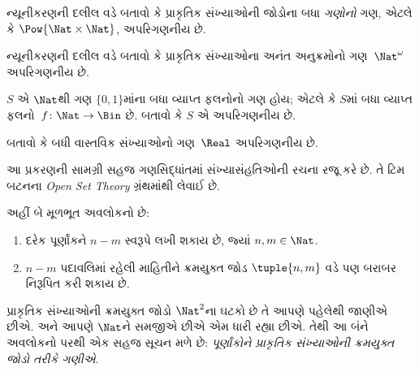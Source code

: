 \begin{prob}
ન્યૂનીકરણની દલીલ વડે બતાવો કે પ્રાકૃતિક સંખ્યાઓની જોડોના બધા
\emph{ગણોનો} ગણ, એટલે કે $\Pow{\Nat \times \Nat}$, અપરિગણનીય છે.
\end{prob}

\begin{prob}
ન્યૂનીકરણની દલીલ વડે બતાવો કે પ્રાકૃતિક સંખ્યાઓના અનંત
અનુક્રમોનો ગણ~$\Nat^\omega$ અપરિગણનીય છે.
\end{prob}


\begin{prob}
$S$ એ $\Nat$થી ગણ $\{0,1\}$માંના બધા વ્યાપ્ત ફલનોનો ગણ હોય;
એટલે કે $S$માં બધા વ્યાપ્ત ફલનો~$f \colon \Nat \to \Bin$ છે.
બતાવો કે $S$ એ અપરિગણનીય છે.
\end{prob}

\begin{prob}
બતાવો કે બધી વાસ્તવિક સંખ્યાઓનો ગણ~$\Real$ અપરિગણનીય છે.
\end{prob}
\endgroup


\OLEndChapterHook
\endgroup


\begingroup
\makeatletter{}\makeatother

\label{guunit:OLP-0041}


\begin{editorial}
આ પ્રકરણની સામગ્રી સહજ ગણસિદ્ધાંતમાં સંખ્યાસંહતિઓની રચના
રજૂ કરે છે. તે ટિમ બટનના \emph{Open Set Theory} ગ્રંથમાંથી લેવાઈ છે.
\end{editorial}

\begingroup
\makeatletter{}\makeatother

\label{guunit:OLP-0042}


અહીં બે મૂળભૂત અવલોકનો છે:
  \begin{enumerate}
    \item દરેક પૂર્ણાંકને $n - m$ સ્વરૂપે લખી શકાય છે, જ્યાં $n, m \in\Nat$.
    \item $n - m$ પદાવલિમાં રહેલી માહિતીને ક્રમયુક્ત જોડ $\tuple{n, m}$ વડે પણ બરાબર નિરૂપિત કરી શકાય છે.
  \end{enumerate}
પ્રાકૃતિક સંખ્યાઓની ક્રમયુક્ત જોડો $\Nat^2$ના ઘટકો છે તે આપણે
પહેલેથી જાણીએ છીએ. અને આપણે $\Nat$ને સમજીએ છીએ એમ ધારી રહ્યા છીએ.
તેથી આ બંને અવલોકનો પરથી એક સહજ સૂચન મળે છે: \emph{પૂર્ણાંકોને
પ્રાકૃતિક સંખ્યાઓની ક્રમયુક્ત જોડો તરીકે ગણીએ}.


